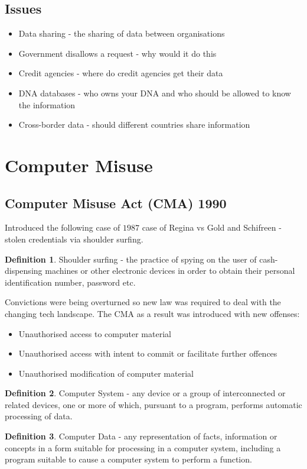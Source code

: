\documentclass[a4paper]{article}
\theoremstyle{plain}
\theoremstyle{definition}
\newtheorem{defn}{Definition}[section]
\theoremstyle{remark}
\begin{document}
\subsection{Issues}
\begin{itemize}
	\item Data sharing - the sharing of data between organisations
	\item Government disallows a request - why would it do this
	\item Credit agencies - where do credit agencies get their data
	\item DNA databases - who owns your DNA and who should be allowed to know the information
	\item Cross-border data - should different countries share information
\end{itemize}
\section{Computer Misuse}
\subsection{Computer Misuse Act (CMA) 1990}
Introduced the following case of $1987$ case of Regina vs Gold and Schifreen - stolen credentials via shoulder surfing. 
\begin{defn}
	Shoulder surfing - the practice of spying on the user of cash-dispensing machines or other electronic devices in order to obtain their personal identification number, password etc.
\end{defn}
Convictions were being overturned so new law was required to deal with the changing tech landscape. The CMA as a result was introduced with new offenses:
\begin{itemize}
	\item Unauthorised access to computer material
	\item Unauthorised access with intent to commit or facilitate further offences
	\item Unauthorised modification of computer material
\end{itemize}
\begin{defn}
	Computer System - any device or a group of interconnected or related devices, one or more of which, pursuant to a program, performs automatic processing of data.
\end{defn}
\begin{defn}
	Computer Data - any representation of facts, information or concepts in a form suitable for processing in a computer system, including a program suitable to cause a computer system to perform a function.
\end{defn}
\end{document}
